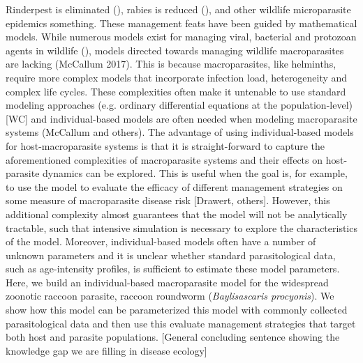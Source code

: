\documentclass[11pt]{article}
\begin{document}
Rinderpest is eliminated (), rabies is reduced (), and other wildlife
microparasite epidemics something. These management feats have been
guided by mathematical models. While numerous models exist for managing
viral, bacterial and protozoan agents in wildlife (), models directed
towards managing wildlife macroparasites are lacking (McCallum 2017).
This is because macroparasites, like helminths, require more complex
models that incorporate infection load, heterogeneity and complex life
cycles. These complexities often make it untenable to use standard
modeling approaches (e.g. ordinary differential equations at the
population-level) {[}WC{]} and individual-based models are often needed
when modeling macroparasite systems (McCallum and others). The advantage
of using individual-based models for host-macroparasite systems is that
it is straight-forward to capture the aforementioned complexities of
macroparasite systems and their effects on host-parasite dynamics can be
explored. This is useful when the goal is, for example, to use the model
to evaluate the efficacy of different management strategies on some
measure of macroparasite disease risk {[}Drawert, others{]}. However,
this additional complexity almost guarantees that the model will not be
analytically tractable, such that intensive simulation is necessary to
explore the characteristics of the model. Moreover, individual-based
models often have a number of unknown parameters and it is unclear
whether standard parasitological data, such as age-intensity profiles,
is sufficient to estimate these model parameters. Here, we build an
individual-based macroparasite model for the widespread zoonotic raccoon
parasite, raccoon roundworm (\emph{Baylisascaris procyonis}). We show
how this model can be parameterized this model with commonly collected
parasitological data and then use this evaluate management strategies
that target both host and parasite populations. {[}General concluding
sentence showing the knowledge gap we are filling in disease ecology{]}
\end{document}
